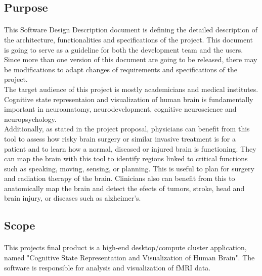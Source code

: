 \documentclass[paper=a4, fontsize=12pt]{scrartcl}	%
\numberwithin{equation}{section}		%
\numberwithin{figure}{section}			%
\numberwithin{table}{section}				%
\newcommand{\skipsubsection}[0]{\vspace{1cm}}
\begin{document}
    \skipsubsection
        
	\subsection{Purpose} 
    \paragraph{}
    \normalsize
    This Software Design Description document is defining the detailed description of the architecture, functionalities and specifications of the project. This document is going to serve as a guideline for both the development team and the users. \\
    
    Since more than one version of this document are going to be released, there may be modifications to adapt changes of requirements and specifications of the project. \\
    
    The target audience of this project is mostly academicians and medical institutes. Cognitive state representaion and visualization of human brain is fundamentally important in neuroanatomy, neurodevelopment, cognitive neuroscience and neuropsychology. \\
    
    Additionally, as stated in the project proposal, physicians can benefit from this tool to assess how risky brain surgery or similar invasive treatment is for a patient and to learn how a normal,
diseased or injured brain is functioning. They can map the brain with this
tool to identify regions linked to critical functions such as speaking, moving,
sensing, or planning. This is useful to plan for surgery and radiation therapy
of the brain. Clinicians also can benefit from this to anatomically map the
brain and detect the efects of tumors, stroke, head and brain injury, or
diseases such as alzheimer's. \\

	\skipsubsection

	\subsection{Scope}
    	\paragraph{}
        \normalsize
        This projects final product is a high-end desktop/compute cluster application, named "Cognitive State Representation and Visualization of Human Brain". The software is responsible for analysis and visualization of fMRI data.\\ 
        
\end{document}
